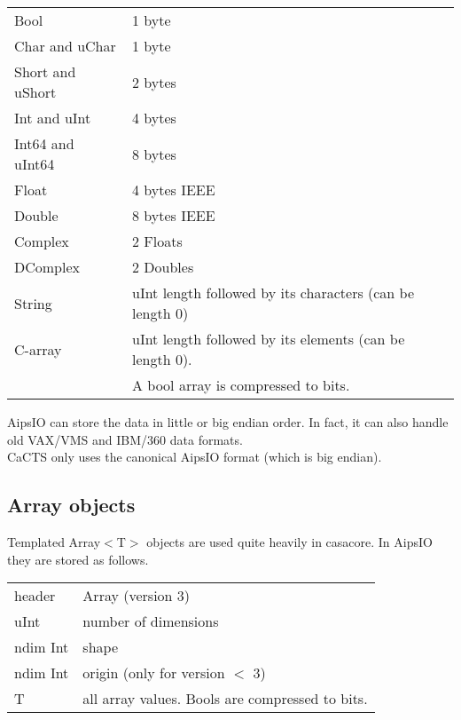 \vspace{0.15in}
\begin{tabular}{|l|p{12cm}|} \hline
  Bool & 1 byte \\
  Char and uChar & 1 byte \\
  Short and uShort & 2 bytes \\
  Int and uInt & 4 bytes \\
  Int64 and uInt64 & 8 bytes \\
  Float & 4 bytes IEEE \\
  Double & 8 bytes IEEE \\
  Complex & 2 Floats \\
  DComplex & 2 Doubles \\
  String & uInt length followed by its characters (can be length 0) \\
  C-array & uInt length followed by its elements (can be length 0).
  \tabularnewline & A bool array is compressed to bits. \\
  \hline
\end{tabular}
\vspace{0.15in}

AipsIO can store the data in little or big endian order. In fact,
it can also handle old VAX/VMS and IBM/360 data formats.
\\CaCTS only uses the canonical AipsIO format (which is big endian).

\subsection{Array objects}
Templated Array$<$T$>$ objects are used quite heavily in casacore. In
AipsIO they are stored as follows.

\vspace{0.15in}
\begin{tabular}{|l|p{13cm}|} \hline
  header & Array (version 3) \\
  uInt & number of dimensions \\
  ndim Int & shape \\
  ndim Int & origin (only for version $<$ 3) \\
  T & all array values. Bools are compressed to bits. \\
  \hline
\end{tabular}
\vspace{0.15in}


